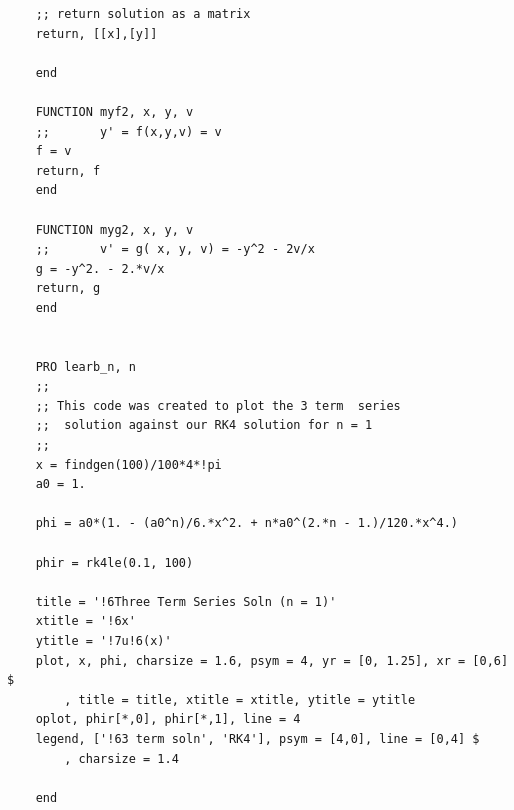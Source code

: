 \documentclass[12pt, manuscript]{article}
\begin{document}
\begin{appendices}
\begin{verbatim}
    ;; return solution as a matrix
    return, [[x],[y]]

    end

    FUNCTION myf2, x, y, v
    ;;       y' = f(x,y,v) = v
    f = v
    return, f
    end

    FUNCTION myg2, x, y, v
    ;;       v' = g( x, y, v) = -y^2 - 2v/x
    g = -y^2. - 2.*v/x
    return, g
    end

    
    PRO learb_n, n
    ;;
    ;; This code was created to plot the 3 term  series
    ;;  solution against our RK4 solution for n = 1
    ;;
    x = findgen(100)/100*4*!pi
    a0 = 1.

    phi = a0*(1. - (a0^n)/6.*x^2. + n*a0^(2.*n - 1.)/120.*x^4.)

    phir = rk4le(0.1, 100)

    title = '!6Three Term Series Soln (n = 1)'
    xtitle = '!6x'
    ytitle = '!7u!6(x)'
    plot, x, phi, charsize = 1.6, psym = 4, yr = [0, 1.25], xr = [0,6] $
        , title = title, xtitle = xtitle, ytitle = ytitle
    oplot, phir[*,0], phir[*,1], line = 4
    legend, ['!63 term soln', 'RK4'], psym = [4,0], line = [0,4] $
        , charsize = 1.4

    end


\end{verbatim}
\end{appendices}


\end{document}
